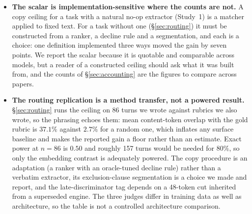 \documentclass[10pt,twocolumn]{article}
\begin{document}
\begin{itemize}[topsep=2pt,itemsep=2pt,leftmargin=1.4em]
\item \textbf{The scalar is implementation-sensitive where the counts are not.} A copy ceiling for a task with a natural no-op extractor (Study~1) is a matcher applied to fixed text. For a task without one (\S\ref{sec:routing}) it must be constructed from a ranker, a decline rule and a segmentation, and each is a choice: one definition implemented three ways moved the gain by seven points. We report the scalar because it is quotable and comparable across models, but a reader of a constructed ceiling should ask what it was built from, and the counts of \S\ref{sec:accounting} are the figures to compare across papers.
\item \textbf{The routing replication is a method transfer, not a powered result.} \S\ref{sec:routing} runs the ceiling on 86 turns we wrote against rubrics we also wrote, so the phrasing echoes them: mean content-token overlap with the gold rubric is $37.1\%$ against $2.7\%$ for a random one, which inflates any surface baseline and makes the reported gain a floor rather than an estimate. Exact power at $n=86$ is $0.50$ and roughly 157 turns would be needed for $80\%$, so only the embedding contrast is adequately powered. The copy procedure is an adaptation (a ranker with an oracle-tuned decline rule) rather than a verbatim extractor, its exclusion-clause segmentation is a choice we made and report, and the late-discriminator tag depends on a 48-token cut inherited from a superseded engine. The three judges differ in training data as well as architecture, so the table is not a controlled architecture comparison.
\end{itemize}
\end{document}
